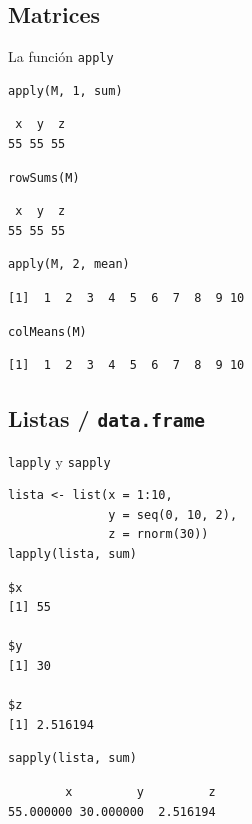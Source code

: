 \documentclass[xcolor={usenames,svgnames,dvipsnames}]{beamer}
\begin{document}
\subsection{Matrices}
\label{sec-4-1}
\begin{frame}[fragile,label=sec-4-1-1]{La función \texttt{apply}}
 \lstset{language=R,label= ,caption= ,numbers=none}
\begin{lstlisting}
apply(M, 1, sum)
\end{lstlisting}

\begin{verbatim}
 x  y  z 
55 55 55
\end{verbatim}

\lstset{language=R,label= ,caption= ,numbers=none}
\begin{lstlisting}
rowSums(M)
\end{lstlisting}

\begin{verbatim}
 x  y  z 
55 55 55
\end{verbatim}

\lstset{language=R,label= ,caption= ,numbers=none}
\begin{lstlisting}
apply(M, 2, mean)
\end{lstlisting}

\begin{verbatim}
[1]  1  2  3  4  5  6  7  8  9 10
\end{verbatim}

\lstset{language=R,label= ,caption= ,numbers=none}
\begin{lstlisting}
colMeans(M)
\end{lstlisting}

\begin{verbatim}
[1]  1  2  3  4  5  6  7  8  9 10
\end{verbatim}
\end{frame}

\subsection{Listas / \texttt{data.frame}}
\label{sec-4-2}
\begin{frame}[fragile,label=sec-4-2-1]{\texttt{lapply} y \texttt{sapply}}
 \lstset{language=R,label= ,caption= ,numbers=none}
\begin{lstlisting}
lista <- list(x = 1:10,
              y = seq(0, 10, 2),
              z = rnorm(30))
lapply(lista, sum)
\end{lstlisting}

\begin{verbatim}
$x
[1] 55

$y
[1] 30

$z
[1] 2.516194
\end{verbatim}

\lstset{language=R,label= ,caption= ,numbers=none}
\begin{lstlisting}
sapply(lista, sum)
\end{lstlisting}

\begin{verbatim}
        x         y         z 
55.000000 30.000000  2.516194
\end{verbatim}
\end{frame}
\end{document}
